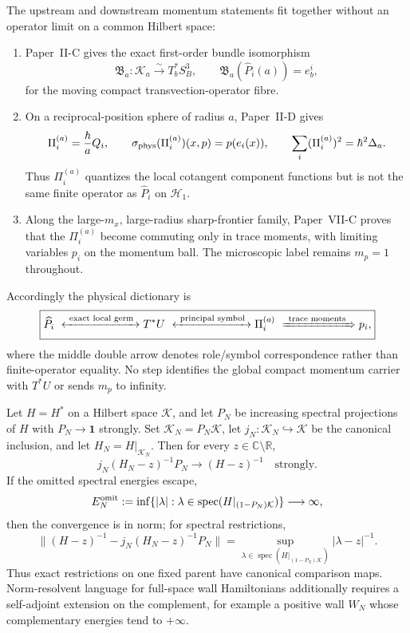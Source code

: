 \documentclass[12pt,a4paper]{article}
\begin{document}
\begin{proposition}
\label{p4:prop:momentum-role-realization-dictionary}
The upstream and downstream momentum statements fit together without an
operator limit on a common Hilbert space:
\begin{enumerate}[label=(\roman*),leftmargin=2.2em]
\item Paper~II-C gives the exact first-order bundle isomorphism
\[
 \mathfrak B_a:\mathscr K_a\overset\sim\longrightarrow T_b^*S_B^3,
 \qquad
 \mathfrak B_a(\widehat P_i(a))=e_b^i,
\]
for the moving compact transvection-operator fibre.
\item On a reciprocal-position sphere of radius $a$, Paper~II-D gives
\[
 \Pi_i^{(a)}=\frac{\hbar}{a}Q_i,
 \qquad
 \sigma_{\rm phys}(\Pi_i^{(a)})(x,p)=p(e_i(x)),
 \qquad
 \sum_i(\Pi_i^{(a)})^2=\hbar^2\Delta_a.
\]
Thus $\Pi_i^{(a)}$ quantizes the local cotangent component functions but is
not the same finite operator as $\widehat P_i$ on $\mathcal H_1$.
\item Along the large-$m_x$, large-radius sharp-frontier family, Paper~VII-C
proves that the $\Pi_i^{(a)}$ become commuting only in trace moments, with
limiting variables $p_i$ on the momentum ball.  The microscopic label remains
$m_p=1$ throughout.
\end{enumerate}
Accordingly the physical dictionary is
\[
 \boxed{
 \widehat P_i\ \xleftrightarrow{\ \text{exact local germ}\ }
 T^*U
 \ \xleftrightarrow{\ \text{principal symbol}\ }
 \Pi_i^{(a)}
 \ \xRightarrow{\ \text{trace moments}\ }
 p_i,}
\]
where the middle double arrow denotes role/symbol correspondence rather than
finite-operator equality.  No step identifies the global compact momentum
carrier with $T^*U$ or sends $m_p$ to infinity.
\end{proposition}

\begin{theorem}
\label{p4:thm:fixed-parent-resolvent-convergence}
Let \(H=H^*\) on a Hilbert space \(\mathcal K\), and let \(P_N\) be increasing
spectral projections of \(H\) with \(P_N\to\mathbf1\) strongly.  Set
\(\mathcal K_N=P_N\mathcal K\), let
\(j_N:\mathcal K_N\hookrightarrow\mathcal K\) be the canonical inclusion,
and let \(H_N=H|_{\mathcal K_N}\).  Then for every
\(z\in\mathbb C\setminus\mathbb R\),
\[
 \boxed{
 j_N(H_N-z)^{-1}P_N
 \longrightarrow(H-z)^{-1}
 \quad\text{strongly}.}
\]
If the omitted spectral energies escape,
\[
 E_N^{\rm omit}:=
 \inf\{|\lambda|:\lambda\in\operatorname{spec}(H|_{(1-P_N)\mathcal K})\}
 \longrightarrow\infty,
\]
then the convergence is in norm; for spectral restrictions,
\[
 \bigl\|(H-z)^{-1}
 -j_N(H_N-z)^{-1}P_N\bigr\|
 =
 \sup_{\lambda\in\operatorname{spec}(H|_{(1-P_N)\mathcal K})}
 |\lambda-z|^{-1}.
\]
Thus exact restrictions on one fixed parent have canonical comparison maps.
Norm-resolvent language for full-space wall Hamiltonians additionally
requires a self-adjoint extension on the complement, for example a positive
wall \(W_N\) whose complementary energies tend to \(+\infty\).
\end{theorem}
\end{document}
